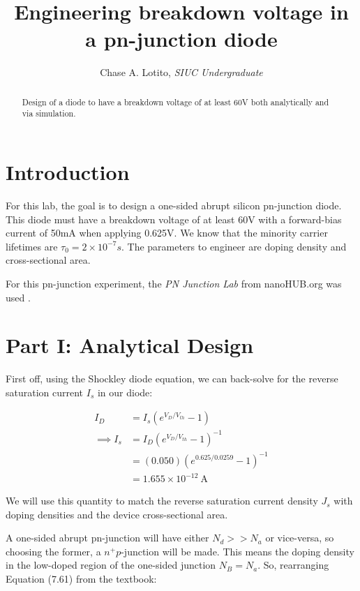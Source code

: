 \documentclass{IEEEtran}
\title{Engineering breakdown voltage in a pn-junction diode}
\author{Chase A. Lotito, \textit{SIUC Undergraduate}}
\date{}
\begin{document}
\maketitle %

\begin{abstract}
    Design of a diode to have a breakdown voltage of at least 60V both analytically and via simulation.
\end{abstract}

\section*{Introduction}

For this lab, the goal is to design a one-sided abrupt silicon pn-junction diode. This diode must have a breakdown voltage of at least 60V with a forward-bias current of 50mA when applying 0.625V. We know that the minority carrier lifetimes are \(\tau_0 = 2 \times 10^{-7} s\). The parameters to engineer are doping density and cross-sectional area.

For this pn-junction experiment, the \textit{PN Junction Lab} from nanoHUB.org was used \cite{sim}.

\section*{Part I: Analytical Design}

First off, using the Shockley diode equation, we can back-solve for the reverse saturation current \(I_s\) in our diode:

\begin{align*}
    I_D &= I_s(e^{V_D/V_{th}} - 1) \\
    \implies I_s &= I_D(e^{V_D/V_{th}} - 1)^{-1} \\
    &= (0.050)(e^{0.625/0.0259} - 1)^{-1} \\
    &= 1.655 \times 10^{-12} ~ \text{A}
\end{align*}

We will use this quantity to match the reverse saturation current density \(J_s\) with doping densities and the device cross-sectional area.

A one-sided abrupt pn-junction will have either \(N_d >> N_a\) or vice-versa, so choosing the former, a \(n^+p\)-junction will be made. This means the doping density in the low-doped region of the one-sided junction \(N_B = N_a\). So, rearranging Equation (7.61) from the textbook:
\end{document}
